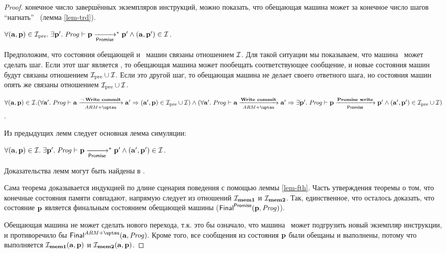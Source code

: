 \begin{proof}
конечное число завершённых экземпляров инструкций, можно показать, что
обещающая машина может за конечное число шагов ``нагнать'' \ARMt~(лемма \ref{lem-trd}).
\begin{lemma}
\label{lem-trd}
$\forall (\mathbf{a}, \mathbf{p}) \in \mathcal{I}_{\textup{\rm pre}}. \;
\exists \mathbf{p}'. \; \mathit{Prog} \vdash \mathbf{p} \xrightarrow[\mathsf{Promise}]{}^{*} \mathbf{p}' \land (\mathbf{a}, \mathbf{p}') \in \mathcal{I}$.
\end{lemma}
\noindent
Предположим, что состояния обещающей и \ARMt~машин связаны отношением $\mathcal{I}$.
Для такой ситуации мы показываем, что машина \ARMt~может сделать шаг.
Если этот шаг является , то обещающая машина
может пообещать соответствующее сообщение, и новые состояния машин будут
связаны отношением $\mathcal{I}_{\textup{\rm pre}} \cup \mathcal{I}$.
Если это другой шаг, то обещающая машина не делает своего ответного шага,
но состояния машин опять же связаны отношением $\mathcal{I}_{\textup{\rm pre}} \cup \mathcal{I}$.
\begin{lemma}
\label{lem-fst}
$\forall (\aT, \p) \in \simrel. \\
(\forall \aT'. \; \Cfprom \vdash \aT \armStepgen{\lnot \; \transenv{Write commit}} \aT' \Rightarrow (\aT', \p) \in \simrelPre \cup \simrel) \land {} \\
(\forall \aT'. \; \Cfprom \vdash \aT \armStepgen{\transenv{Write commit}} \aT' \Rightarrow
\exists \p'. \; \Cfprom \vdash \p \promStepgen{\transenv{Promise write}} \p' \land  (\aT', \p') \in \simrelPre \cup \simrel)$.
\end{lemma}
Из предыдущих лемм следует основная лемма симуляции:
\begin{lemma}
  \label{lem-fth}
$\forall (\mathbf{a}, \mathbf{p}) \in \mathcal{I}. \;
\exists \mathbf{p}'. \; \mathit{Prog} \vdash \mathbf{p} \xrightarrow[\mathsf{Promise}]{}^{*} \mathbf{p}' \land (\mathbf{a}', \mathbf{p}') \in \mathcal{I}$.
\end{lemma}
Доказательства лемм могут быть найдены в \cite{Podkopaev-al:ECOOP17TR}.

Сама теорема доказывается индукцией по длине сценария поведения с помощью леммы \ref{lem-fth}.
Часть утверждения теоремы о том, что конечные состояния памяти совпадают,
напрямую следует из отношений $\mathcal{I}_{\rm \bf mem1}$ и $\mathcal{I}_{\rm \bf mem2}$.
Так, единственное, что осталось доказать, что состояние $\mathbf{p}$ является
финальным состоянием обещающей машины ($\mathsf{Final}^{\mathsf{Promise}}(\mathbf{p}, \mathit{Prog})$).

Обещающая машина не может сделать нового перехода, т.к. это бы означало, что
машина \ARMt~может подгрузить новый экземпляр инструкции, и противоречило бы 
$\finalStateA(\aT, \Cfarm)$. Кроме того, все сообщения из состояния $\mathbf{p}$
были обещаны и выполнены, потому что выполняется
$\mathcal{I}_{\rm \bf mem1}(\mathbf{a},\mathbf{p})$ и $\mathcal{I}_{\rm \bf mem2}(\mathbf{a}, \mathbf{p})$.
\end{proof}

